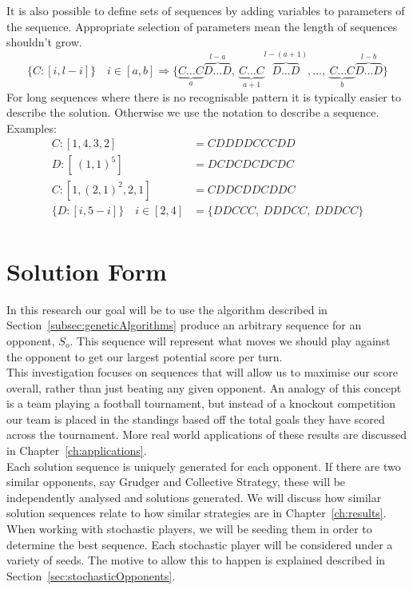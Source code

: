 It is also possible to define sets of sequences by adding variables to parameters of the sequence.
Appropriate selection of parameters mean the length of sequences shouldn't grow.
\[ \{C:[i,l-i]\} \quad i\in [a,b] \Rightarrow \{\underbrace{C\ldots C}_{a}\overbrace{D\ldots D}^{l-a},\ \underbrace{C\ldots C}_{a+1}\overbrace{D\ldots D}^{l-(a+1)},\ldots ,\ \underbrace{C\ldots C}_{b}\overbrace{D\ldots D}^{l-b}\} \]
For long sequences where there is no recognisable pattern it is typically easier to describe the solution.
Otherwise we use the notation to describe a sequence.\\
Examples:
\begin{align}
    C:[1,4,3,2] &= CDDDDCCCDD\\
    D:[\ (1,1)^{5}] &= DCDCDCDCDC\\
    C:[1,(2,1)^{2},2,1] &= CDDCDDCDDC\\
    \{D:[i,5-i]\} \quad i\in [2,4] &= \{DDCCC,\ DDDCC,\ DDDCC\}\\
\end{align}

\section{Solution Form}\label{sec:solutionForm}
In this research our goal will be to use the algorithm described in Section~\ref{subsec:geneticAlgorithms} produce an arbitrary sequence for an opponent, \(S_o\).
This sequence will represent what moves we should play against the opponent to get our largest potential score per turn.\\

This investigation focuses on sequences that will allow us to maximise our score overall, rather than just beating any given opponent.
An analogy of this concept is a team playing a football tournament, but instead of a knockout competition our team is placed in the standings based off the total goals they have scored across the tournament.
More real world applications of these results are discussed in Chapter~\ref{ch:applications}.\\

Each solution sequence is uniquely generated for each opponent.
If there are two similar opponents, say Grudger and Collective Strategy, these will be independently analysed and solutions generated. %
We will discuss how similar solution sequences relate to how similar strategies are in Chapter~\ref{ch:results}.
When working with stochastic players, we will be seeding them in order to determine the best sequence.
Each stochastic player will be considered under a variety of seeds.
The motive to allow this to happen is explained described in Section~\ref{sec:stochasticOpponents}.

